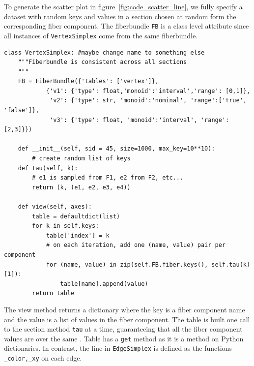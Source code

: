 \documentclass[../main.tex]{subfiles}
\begin{document}
To generate the scatter plot in figure~\ref{fig:code_scatter_line}, we fully specify a dataset with random keys and values in a section chosen at random form the corresponding fiber component. The fiberbundle \texttt{FB} is a class level attribute since all instances of \texttt{VertexSimplex} come from the same fiberbundle.
\begin{verbatim}
class VertexSimplex: #maybe change name to something else
    """Fiberbundle is consistent across all sections
    """
    FB = FiberBundle({'tables': ['vertex']},  
            {'v1': {'type': float,'monoid':'interval','range': [0,1]},
             'v2': {'type': str, 'monoid':'nominal', 'range':['true', 'false']},
             'v3': {'type': float, 'monoid':'interval', 'range':[2,3]}})

    def __init__(self, sid = 45, size=1000, max_key=10**10):
        # create random list of keys
    def tau(self, k):
        # e1 is sampled from F1, e2 from F2, etc...
        return (k, (e1, e2, e3, e4))

    def view(self, axes):
        table = defaultdict(list)
        for k in self.keys:
            table['index'] = k
            # on each iteration, add one (name, value) pair per component
            for (name, value) in zip(self.FB.fiber.keys(), self.tau(k)[1]):
                table[name].append(value)
        return table
\end{verbatim}
The view method returns a dictionary where the key is a fiber component name and the value is a list of values in the fiber component. The table is built one call to the section method \texttt{tau} at a time, guaranteeing that all the fiber component values are over the same \dbasepoint. Table has a \texttt{get} method as it is a method on Python dictionaries. In contrast, the line in \texttt{EdgeSimplex} is defined as the functions \texttt{_color,_xy} on each edge. 
\end{document}
